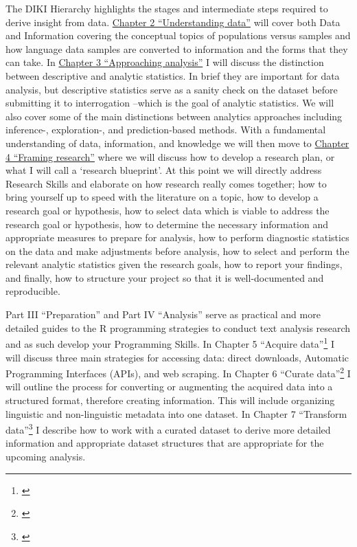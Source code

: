 \documentclass[
]{article}
\DeclareRobustCommand{\href}[2]{#2\footnote{\url{#1}}}
\begin{document}
The DIKI Hierarchy highlights the stages and intermediate steps required to derive insight from data. \protect\hyperlink{understanding-data}{Chapter 2 ``Understanding data''} will cover both Data and Information covering the conceptual topics of populations versus samples and how language data samples are converted to information and the forms that they can take. In \protect\hyperlink{approaching-analysis}{Chapter 3 ``Approaching analysis''} I will discuss the distinction between descriptive and analytic statistics. In brief they are important for data analysis, but descriptive statistics serve as a sanity check on the dataset before submitting it to interrogation --which is the goal of analytic statistics. We will also cover some of the main distinctions between analytics approaches including inference-, exploration-, and prediction-based methods. With a fundamental understanding of data, information, and knowledge we will then move to \protect\hyperlink{framing-research}{Chapter 4 ``Framing research''} where we will discuss how to develop a research plan, or what I will call a `research blueprint'. At this point we will directly address Research Skills and elaborate on how research really comes together; how to bring yourself up to speed with the literature on a topic, how to develop a research goal or hypothesis, how to select data which is viable to address the research goal or hypothesis, how to determine the necessary information and appropriate measures to prepare for analysis, how to perform diagnostic statistics on the data and make adjustments before analysis, how to select and perform the relevant analytic statistics given the research goals, how to report your findings, and finally, how to structure your project so that it is well-documented and reproducible.

Part III ``Preparation'' and Part IV ``Analysis'' serve as practical and more detailed guides to the R programming strategies to conduct text analysis research and as such develop your Programming Skills. In \href{}{Chapter 5 ``Acquire data''} I will discuss three main strategies for accessing data: direct downloads, Automatic Programming Interfaces (APIs), and web scraping. In \href{}{Chapter 6 ``Curate data''} I will outline the process for converting or augmenting the acquired data into a structured format, therefore creating information. This will include organizing linguistic and non-linguistic metadata into one dataset. In \href{}{Chapter 7 ``Transform data''} I describe how to work with a curated dataset to derive more detailed information and appropriate dataset structures that are appropriate for the upcoming analysis.
\end{document}
